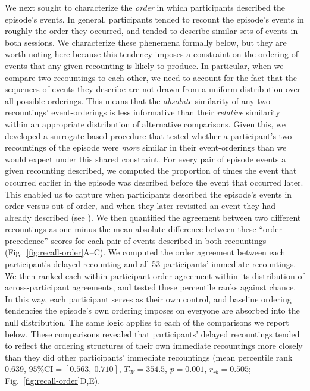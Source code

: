 \documentclass[10pt]{article}
\renewcommand{\nameref}[1]{\textit{\oldnameref{#1}}}
\begin{document}
We next sought to characterize the \textit{order} in which participants described the episode's events.
In general, participants tended to recount the episode's events in roughly the order they occurred, and tended to describe similar sets of events in both sessions.
We characterize these phenemena formally below, but they are worth noting here because this tendency imposes a constraint on the ordering of events that any given recounting is likely to produce.
In particular, when we compare two recountings to each other, we need to account for the fact that the sequences of events they describe are not drawn from a uniform distribution over all possible orderings.
This means that the \textit{absolute} similarity of any two recountings' event-orderings is less informative than their \textit{relative} similarity within an appropriate distribution of alternative comparisons.
Given this, we developed a surrogate-based procedure that tested whether a participant's two recountings of the episode were \textit{more} similar in their event-orderings than we would expect under this shared constraint.
For every pair of episode events a given recounting described, we computed the proportion of times the event that occurred earlier in the episode was described before the event that occurred later. 
This enabled us to capture when participants described the episode's events in order versus out of order, and when they later revisited an event they had already described (see \nameref{subsec:precedence}).
We then quantified the agreement between two different recountings as one minus the mean absolute difference between these ``order precedence'' scores for each pair of events described in both recountings (Fig.~\ref{fig:recall-order}A--C).
We computed the order agreement between each participant's delayed recounting and all 53 participants' immediate recountings.
We then ranked each within-participant order agreement within its distribution of across-participant agreements, and tested these percentile ranks against chance.
In this way, each participant serves as their own control, and baseline ordering tendencies the episode's own ordering imposes on everyone are absorbed into the null distribution.
The same logic applies to each of the comparisons we report below.
These comparisons revealed that participants' delayed recountings tended to reflect the ordering structures of their own immediate recountings more closely than they did other participants' immediate recountings (mean percentile rank = 0.639, $\text{95\% CI} = \left[0.563,~0.710\right]$, $T_W = 354.5$, $p = 0.001$, $r_{rb} = 0.505$; Fig.~\ref{fig:recall-order}D,E).
\end{document}
